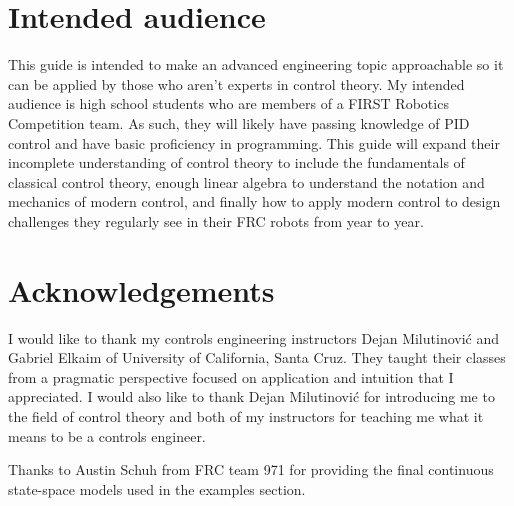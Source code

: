 \section*{Intended audience}

This guide is intended to make an advanced engineering topic approachable so it
can be applied by those who aren't experts in control theory. My intended
audience is high school students who are members of a FIRST Robotics Competition
team. As such, they will likely have passing knowledge of PID control and have
basic proficiency in programming. This guide will expand their incomplete
understanding of control theory to include the fundamentals of classical control
theory, enough linear algebra to understand the notation and mechanics of modern
control, and finally how to apply modern control to design challenges they
regularly see in their FRC robots from year to year.

\section*{Acknowledgements}

I would like to thank my controls engineering instructors Dejan Milutinovi\'c
and Gabriel Elkaim of University of California, Santa Cruz. They taught their
classes from a pragmatic perspective focused on application and intuition that I
appreciated. I would also like to thank Dejan Milutinovi\'c for introducing me
to the field of control theory and both of my instructors for teaching me what
it means to be a controls engineer.

Thanks to Austin Schuh from FRC team 971 for providing the final continuous
state-space models used in the examples section.
